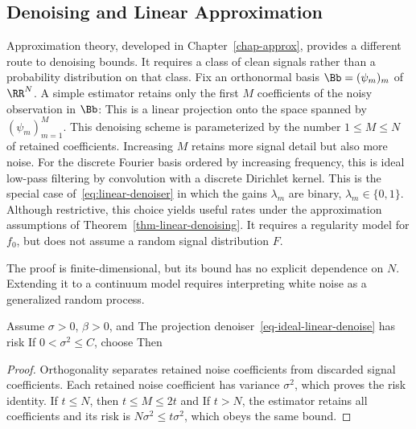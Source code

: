 \subsection{Denoising and Linear Approximation}

Approximation theory, developed in Chapter~\ref{chap-approx}, provides a different route to denoising bounds. It requires a class of clean signals rather than a probability distribution on that class.
%
Fix an orthonormal basis $\Bb = (\psi_m)_m$ of $\RR^N$. A simple estimator retains only the first $M$ coefficients of the noisy observation in $\Bb$:
This is a linear projection onto the space spanned by $(\psi_m)_{m=1}^M$.
%
This denoising scheme is parameterized by the number $1\leq M\leq N$ of retained coefficients. Increasing $M$ retains more signal detail but also more noise.
%
For the discrete Fourier basis ordered by increasing frequency, this is ideal low-pass filtering by convolution with a discrete Dirichlet kernel.
%
This is the special case of~\eqref{eq:linear-denoiser} in which the gains $\lambda_m$ are binary, $\lambda_m \in \{0,1\}$. Although restrictive, this choice yields useful rates under the approximation assumptions of Theorem~\ref{thm-linear-denoising}. It requires a regularity model for $f_0$, but does not assume a random signal distribution $F$.

The proof is finite-dimensional, but its bound has no explicit dependence on $N$. Extending it to a continuum model requires interpreting white noise as a generalized random process.


\begin{thm}\label{thm-linear-denoising}
Assume $\sigma>0$, $\beta>0$, and
The projection denoiser~\eqref{eq-ideal-linear-denoise} has risk
If $0<\sigma^2\leq C$, choose
Then
\end{thm}
\begin{proof}
Orthogonality separates retained noise coefficients from discarded signal coefficients. Each retained noise coefficient has variance $\sigma^2$, which proves the risk identity. If $t\leq N$, then $t\leq M\leq2t$ and
If $t>N$, the estimator retains all coefficients and its risk is $N\sigma^2\leq t\sigma^2$, which obeys the same bound.
\end{proof}

